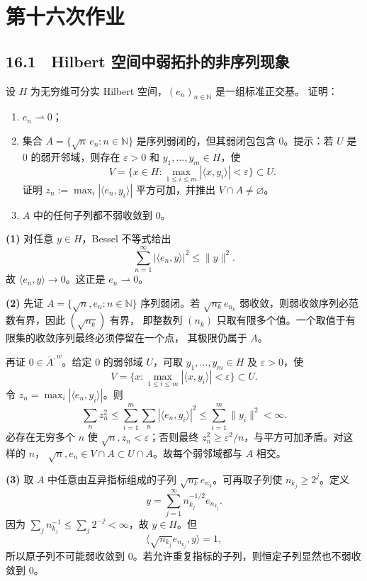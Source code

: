\section{第十六次作业}

\subsection*{16.1　Hilbert 空间中弱拓扑的非序列现象}

\begin{problem}
设 $H$ 为无穷维可分实 Hilbert 空间，$(e_n)_{n\in\mathbb N}$ 是一组标准正交基。
证明：
\begin{enumerate}
 \item $e_n\rightharpoonup0$；
 \item 集合 $A=\{\sqrt n\,e_n:n\in\mathbb N\}$ 是序列弱闭的，但其弱闭包包含
 $0$。提示：若 $U$ 是 $0$ 的弱开邻域，则存在 $\varepsilon>0$ 和
 $y_1,\dots,y_m\in H$，使
 \[
  V=\{x\in H:\max_{1\le i\le m}|\langle x,y_i\rangle|<\varepsilon\}\subset U.
 \]
 证明 $z_n:=\max_i|\langle e_n,y_i\rangle|$ 平方可加，并推出 $V\cap A\ne\varnothing$。
 \item $A$ 中的任何子列都不弱收敛到 $0$。
\end{enumerate}
\end{problem}

\textbf{(1)} 对任意 $y\in H$，Bessel 不等式给出
\[
 \sum_{n=1}^\infty|\langle e_n,y\rangle|^2\le\|y\|^2.
\]
故 $\langle e_n,y\rangle\to0$。这正是 $e_n\rightharpoonup0$。

\textbf{(2)} 先证 $A=\{\sqrt n,e_n:n\in\mathbb N\}$ 序列弱闭。若
$\sqrt{n_k}e_{n_k}$ 弱收敛，则弱收敛序列必范数有界，因此 $(\sqrt{n_k})$ 有界，
即整数列 $(n_k)$ 只取有限多个值。一个取值于有限集的收敛序列最终必须停留在一个点，
其极限仍属于 $A$。

再证 $0\in\overline A^{,w}$。给定 $0$ 的弱邻域 $U$，可取
$y_1,\dots,y_m\in H$ 及 $\varepsilon>0$，使
\[
 V=\{x:\max_{1\le i\le m}|\langle x,y_i\rangle|<\varepsilon\}\subset U.
\]
令 $z_n=\max_i|\langle e_n,y_i\rangle|$。则
\[
 \sum_nz_n^2\le\sum_{i=1}^m\sum_n|\langle e_n,y_i\rangle|^2
 \le\sum_{i=1}^m\|y_i\|^2<\infty.
\]
必存在无穷多个 $n$ 使 $\sqrt n,z_n<\varepsilon$；否则最终
$z_n^2\ge\varepsilon^2/n$，与平方可加矛盾。对这样的 $n$，
$\sqrt n,e_n\in V\cap A\subset U\cap A$。故每个弱邻域都与 $A$ 相交。

\textbf{(3)} 取 $A$ 中任意由互异指标组成的子列
$\sqrt{n_k}e_{n_k}$。可再取子列使 $n_{k_j}\ge2^j$。定义
\[
 y=\sum_{j=1}^\infty n_{k_j}^{-1/2}e_{n_{k_j}}.
\]
因为 $\sum_jn_{k_j}^{-1}\le\sum_j2^{-j}<\infty$，故 $y\in H$。但
\[
 \langle\sqrt{n_{k_j}}e_{n_{k_j}},y\rangle=1,
\]
所以原子列不可能弱收敛到 $0$。若允许重复指标的子列，则恒定子列显然也不弱收敛到
$0$。

